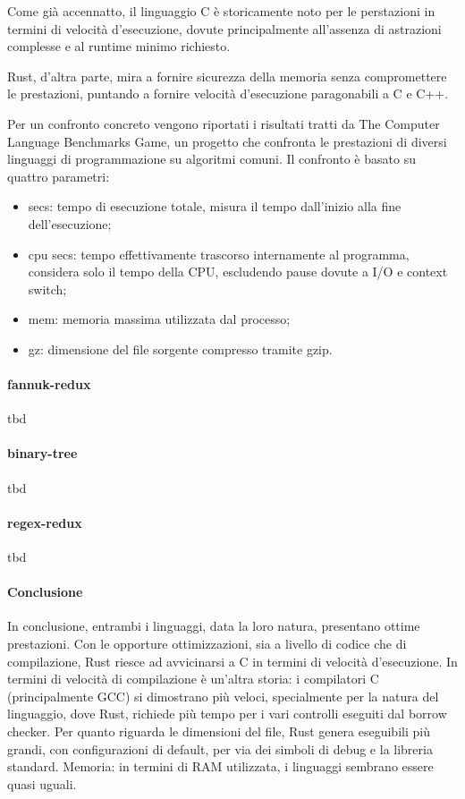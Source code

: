Come già accennatto, il linguaggio C è storicamente noto per le perstazioni in termini di velocità d'esecuzione, dovute principalmente all'assenza di astrazioni
complesse e al runtime minimo richiesto. 

Rust, d'altra parte, mira a fornire sicurezza della memoria senza compromettere le prestazioni, puntando a fornire velocità d'esecuzione paragonabili a C e C++.

Per un confronto concreto vengono riportati i risultati tratti da The Computer Language Benchmarks Game\cite{benchmarksgame}, un progetto
che confronta le prestazioni di diversi linguaggi di programmazione su algoritmi comuni. Il confronto è basato su quattro 
parametri: 
\begin{itemize}
    \item secs: tempo di esecuzione totale, misura il tempo dall'inizio alla fine dell'esecuzione; 
    \item cpu secs: tempo effettivamente trascorso internamente al programma, considera solo il tempo della CPU, escludendo pause dovute a I/O e context switch;
    \item mem: memoria massima utilizzata dal processo; 
    \item gz: dimensione del file sorgente compresso tramite gzip.
\end{itemize}

\paragraph{fannuk-redux} tbd

\paragraph{binary-tree} tbd

\paragraph{regex-redux} tbd

\paragraph{Conclusione} In conclusione, entrambi i linguaggi, data la loro natura, presentano ottime prestazioni. Con le opporture ottimizzazioni, sia 
a livello di codice che di compilazione, Rust riesce ad avvicinarsi a C in termini di velocità d'esecuzione. In termini di velocità di compilazione è un'altra storia:
i compilatori C (principalmente GCC) si dimostrano più veloci, specialmente per la natura del linguaggio, dove Rust, richiede più tempo per i vari controlli eseguiti
dal borrow checker. Per quanto riguarda le dimensioni del file, Rust genera eseguibili più grandi, con configurazioni di default, per via dei simboli di debug e la libreria standard.
Memoria: in termini di RAM utilizzata, i linguaggi sembrano essere quasi uguali.

